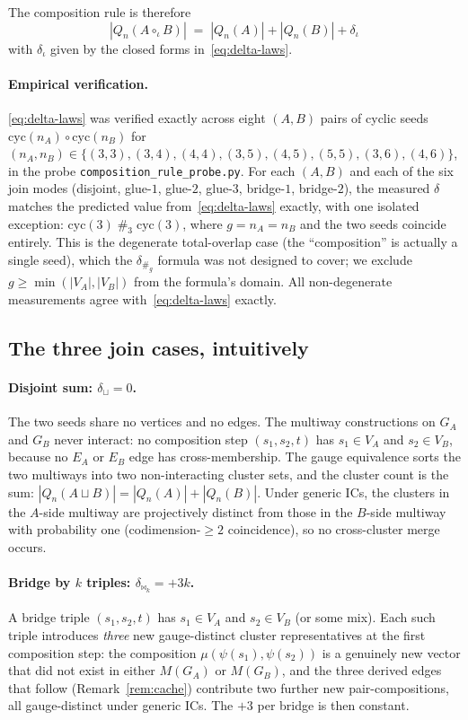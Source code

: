 \documentclass[12pt,a4paper]{article}
\theoremstyle{definition}
\theoremstyle{remark}
\newcommand{\Qn}{Q_n}
\newcommand{\cyc}{\mathrm{cyc}}
\newcommand{\bridge}{\mathbin{\bowtie}}     %
\newcommand{\glue}{\mathbin{\#}}            %
\begin{document}
The composition rule is therefore
\begin{equation}\label{eq:composition-rule}
\boxed{
|\Qn(A \circ_\iota B)| \;=\; |\Qn(A)| + |\Qn(B)| + \delta_\iota
}
\end{equation}
with $\delta_\iota$ given by the closed forms in~\eqref{eq:delta-laws}.

\paragraph{Empirical verification.}
\eqref{eq:delta-laws} was verified exactly across eight $(A, B)$
pairs of cyclic seeds $\cyc(n_A) \circ \cyc(n_B)$ for
$(n_A, n_B) \in \{(3,3), (3,4), (4,4), (3,5), (4,5), (5,5),
(3,6), (4,6)\}$, in the probe
\texttt{composition\_rule\_probe.py}. For each $(A, B)$ and each of
the six join modes (disjoint, glue-$1$, glue-$2$, glue-$3$,
bridge-$1$, bridge-$2$), the measured $\delta$ matches the predicted
value from~\eqref{eq:delta-laws} exactly, with one isolated
exception: $\cyc(3) \glue_3 \cyc(3)$, where $g = n_A = n_B$ and the
two seeds coincide entirely. This is the degenerate total-overlap
case (the ``composition'' is actually a single seed), which the
$\delta_{\glue_g}$ formula was not designed to cover; we exclude
$g \ge \min(|V_A|, |V_B|)$ from the formula's domain. All
non-degenerate measurements agree with~\eqref{eq:delta-laws} exactly.

\subsection{The three join cases, intuitively}\label{sec:comp-three-cases}

\paragraph{Disjoint sum: $\delta_{\sqcup} = 0$.}
The two seeds share no vertices and no edges. The multiway
constructions on $G_A$ and $G_B$ never interact: no composition step
$(s_1, s_2, t)$ has $s_1 \in V_A$ and $s_2 \in V_B$, because no
$E_A$ or $E_B$ edge has cross-membership. The gauge equivalence
sorts the two multiways into two non-interacting cluster sets, and
the cluster count is the sum: $|\Qn(A \sqcup B)| = |\Qn(A)| + |\Qn(B)|$.
Under generic ICs, the clusters in the $A$-side multiway are
projectively distinct from those in the $B$-side multiway with
probability one (codimension-$\ge 2$ coincidence), so no
cross-cluster merge occurs.

\paragraph{Bridge by $k$ triples: $\delta_{\bridge_k} = +3k$.}
A bridge triple $(s_1, s_2, t)$ has $s_1 \in V_A$ and $s_2 \in V_B$
(or some mix). Each such triple introduces \emph{three} new
gauge-distinct cluster representatives at the first
composition step: the composition $\mu(\psi(s_1), \psi(s_2))$ is a
genuinely new vector that did not exist in either $M(G_A)$ or
$M(G_B)$, and the three derived edges that follow (Remark~\ref{rem:cache})
contribute two further new pair-compositions, all gauge-distinct
under generic ICs. The $+3$ per bridge is then constant.
\end{document}
